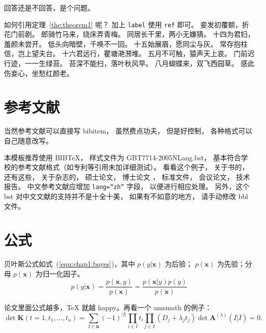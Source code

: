 \begin{problem}
 回答还是不回答，是个问题。 
\end{problem}

如何引用定理~\ref{the:theorem1} 呢？
加上 \verb|label| 使用 \verb|ref| 即可。
妾发初覆额，折花门前剧。
郎骑竹马来，绕床弄青梅。
同居长干里，两小无嫌猜。
十四为君妇，羞颜未尝开。
低头向暗壁，千唤不一回。
十五始展眉，愿同尘与灰。
常存抱柱信，岂上望夫台。
十六君远行，瞿塘滟滪堆。
五月不可触，猿声天上哀。
门前迟行迹，一一生绿苔。
苔深不能扫，落叶秋风早。
八月蝴蝶来，双飞西园草。
感此伤妾心，坐愁红颜老。

\section{参考文献}
\label{sec:bib}
当然参考文献可以直接写 bibitem，
虽然费点功夫，
但是好控制，
各种格式可以自己随意改写。

本模板推荐使用 BIB\TeX，
样式文件为 GBT7714-2005NLang.bst，
基本符合学校的参考文献格式（如专利等引用未加详细测试）。
看看这个例子，
关于书的\cite{tex, companion, ColdSources}，
还有这些\cite{Krasnogor2004e, clzs, zjsw}，
关于杂志的\cite{ELIDRISSI94, MELLINGER96, SHELL02}，
硕士论文\cite{zhubajie, metamori2004}，
博士论文 \cite{shaheshang, FistSystem01}，
标准文件\cite{IEEE-1363}，
会议论文\cite{DPMG,kocher99}，
技术报告\cite{NPB2}。
中文参考文献\cite{cnarticle}应增加 \texttt{lang=``zh''} 字段，
以便进行相应处理。
另外，这个 bst 对中文文献\cite{cnproceed}的支持并不是十全十美，
如果有不如意的地方，
请手动修改 bbl 文件。


\section{公式}
\label{sec:equation}
贝叶斯公式如式~(\ref{equ:chap1:bayes})，其中 $p(y|\mathbf{x})$ 为后验；
$p(\mathbf{x})$ 为先验；分母 $p(\mathbf{x})$ 为归一化因子。
\begin{equation}
\label{equ:chap1:bayes}
p(y|\mathbf{x}) = \frac{p(\mathbf{x},y)}{p(\mathbf{x})}=
\frac{p(\mathbf{x}|y)p(y)}{p(\mathbf{x})} 
\end{equation}

论文里面公式越多，\TeX{} 就越 happy。再看一个 \textsf{amsmath} 的例子：
\newcommand{\envert}[1]{\left\lvert#1\right\rvert} 
\begin{equation}\label{detK2}
\det\mathbf{K}(t=1,t_1,\dots,t_n)=\sum_{I\in\mathbf{n}}(-1)^{\envert{I}}
\prod_{i\in I}t_i\prod_{j\in I}(D_j+\lambda_jt_j)\det\mathbf{A}
^{(\lambda)}(\overline{I}|\overline{I})=0.
\end{equation} 

